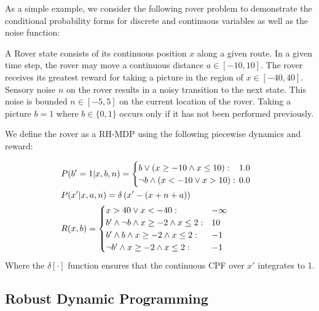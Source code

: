 As a simple example, we consider the following rover problem to demonstrate the conditional probability forms for discrete and continuous variables as well as the noise function: 
\begin{example*}[Rover]
A Rover state consists of its continuous position $x$ along a
given route.  In a given time step, the rover may move a 
continuous distance $a \in [-10,10]$.  The rover receives its greatest
reward for taking a picture in the region of $x \in [-40,40]$. Sensory noise $n$ on the rover results in a noisy transition to the next state. This noise is bounded $n \in [-5,5]$ on the current location of the rover.
Taking a picture $b=1$ where $b \in \{0,1\}$ occurs only if it has not been performed previously. 
\end{example*}
We define the rover  as a RH-MDP using the following piecewise dynamics and reward:

\begin{align} 
\hspace{-2.8mm} & P(b' =1|x,b,n) = 
\begin{cases}
b \lor (x \geq -10 \land x \leq 10): & \hspace{-2mm} 1.0\\
\neg b \land (x < -10 \lor x > 10):  & \hspace{-2mm} 0.0
\end{cases} \label{eq:mr_discrete_trans} \\
\hspace{-2.8mm} & P(x'|x,a,n)  = \delta \left( x' - (x+n+a) \right) \label{eq:mr_cont_trans} \\
\hspace{-2.8mm} & R(x,b) = \begin{cases}
x > 40 \lor x < -40 : & -\infty \\
b' \land \neg b \land x \geq -2 \land x \leq 2 : & 10 \\
b' \land b \land x \geq -2 \land x \leq 2 : & -1\\
\neg b' \land x \geq -2 \land x \leq 2 : & -1\\
\end{cases} 
\end{align}
 Where the $\delta[\cdot]$ function ensures that the continuous CPF over $x'$ integrates to 1.
 
\subsection{Robust Dynamic Programming}

